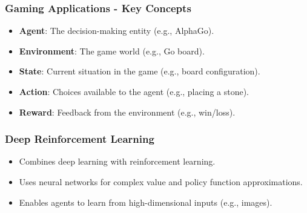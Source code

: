 \documentclass[aspectratio=169]{beamer}
\begin{document}
\begin{frame}[fragile]
    \frametitle{Gaming Applications - Key Concepts}
    \begin{itemize}
        \item \textbf{Agent}: The decision-making entity (e.g., AlphaGo).
        \item \textbf{Environment}: The game world (e.g., Go board).
        \item \textbf{State}: Current situation in the game (e.g., board configuration).
        \item \textbf{Action}: Choices available to the agent (e.g., placing a stone).
        \item \textbf{Reward}: Feedback from the environment (e.g., win/loss).
    \end{itemize}
\end{frame}

\begin{frame}[fragile]
    \frametitle{Deep Reinforcement Learning}
    \begin{itemize}
        \item Combines deep learning with reinforcement learning.
        \item Uses neural networks for complex value and policy function approximations.
        \item Enables agents to learn from high-dimensional inputs (e.g., images).
    \end{itemize}
\end{frame}
\end{document}
